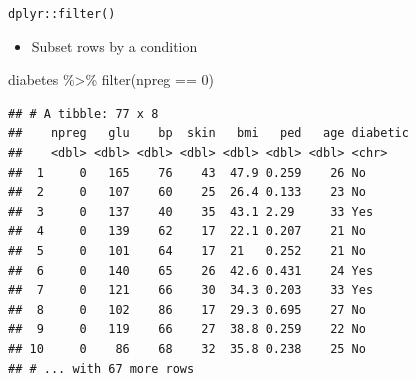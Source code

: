 \documentclass[
  ignorenonframetext,
]{beamer}
\newenvironment{Shaded}{\begin{snugshade}}{\end{snugshade}}
\newcommand{\DecValTok}[1]{\textcolor[rgb]{0.00,0.00,0.81}{#1}}
\newcommand{\FunctionTok}[1]{\textcolor[rgb]{0.00,0.00,0.00}{#1}}
\newcommand{\NormalTok}[1]{#1}
\newcommand{\SpecialCharTok}[1]{\textcolor[rgb]{0.00,0.00,0.00}{#1}}
\providecommand{\tightlist}{%
  \setlength{\itemsep}{0pt}\setlength{\parskip}{0pt}}
\begin{document}
\begin{frame}[fragile]{\texttt{dplyr::filter()}}
\protect\hypertarget{dplyrfilter}{}
\begin{itemize}
\tightlist
\item
  Subset rows by a condition
\end{itemize}

\begin{Shaded}
\begin{Highlighting}[]
\NormalTok{diabetes }\SpecialCharTok{\%\textgreater{}\%} 
  \FunctionTok{filter}\NormalTok{(npreg }\SpecialCharTok{==} \DecValTok{0}\NormalTok{)}
\end{Highlighting}
\end{Shaded}

\begin{verbatim}
## # A tibble: 77 x 8
##    npreg   glu    bp  skin   bmi   ped   age diabetic
##    <dbl> <dbl> <dbl> <dbl> <dbl> <dbl> <dbl> <chr>   
##  1     0   165    76    43  47.9 0.259    26 No      
##  2     0   107    60    25  26.4 0.133    23 No      
##  3     0   137    40    35  43.1 2.29     33 Yes     
##  4     0   139    62    17  22.1 0.207    21 No      
##  5     0   101    64    17  21   0.252    21 No      
##  6     0   140    65    26  42.6 0.431    24 Yes     
##  7     0   121    66    30  34.3 0.203    33 Yes     
##  8     0   102    86    17  29.3 0.695    27 No      
##  9     0   119    66    27  38.8 0.259    22 No      
## 10     0    86    68    32  35.8 0.238    25 No      
## # ... with 67 more rows
\end{verbatim}
\end{frame}
\end{document}
